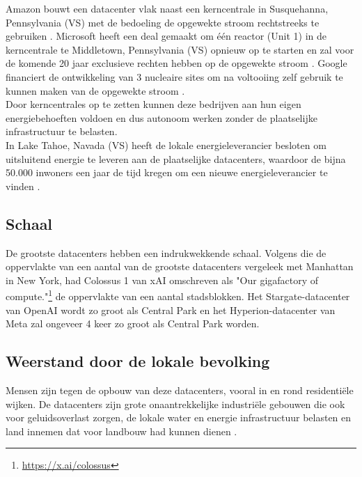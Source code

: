 Amazon bouwt een datacenter vlak naast een kerncentrale in Susquehanna, Pennsylvania (VS) met de bedoeling de opgewekte stroom rechtstreeks te gebruiken \autocite{Moseman2024}. Microsoft heeft een deal gemaakt om één reactor (Unit 1) in de kerncentrale te Middletown, Pennsylvania (VS) opnieuw op te starten en zal voor de komende 20 jaar exclusieve rechten hebben op de opgewekte stroom \autocite{Reuters2024}. Google financiert de ontwikkeling van 3 nucleaire sites om na voltooiing zelf gebruik te kunnen maken van de opgewekte stroom \autocite{Stevens2025}. \\

Door kerncentrales op te zetten kunnen deze bedrijven aan hun eigen energiebehoeften voldoen en dus autonoom werken zonder de plaatselijke infrastructuur te belasten. \\

In Lake Tahoe, Navada (VS) heeft de lokale energieleverancier besloten om uitsluitend energie te leveren aan de plaatselijke datacenters, waardoor de bijna 50.000 inwoners een jaar de tijd kregen om een nieuwe energieleverancier te vinden \autocite{Gioino2026}.\\

\subsection{Schaal}
\label{ssec:schaal}
De grootste datacenters hebben een indrukwekkende schaal. Volgens \textcite{Cottier2025} die de oppervlakte van een aantal van de grootste datacenters vergeleek met Manhattan in New York, had Colossus 1 van xAI omschreven als "Our gigafactory of compute."\footnote{\href{https://x.ai/colossus}{https://x.ai/colossus}} de oppervlakte van een aantal stadsblokken. Het Stargate-datacenter van OpenAI wordt zo groot als Central Park en het Hyperion-datacenter van Meta zal ongeveer 4 keer zo groot als Central Park worden.

\subsection{Weerstand door de lokale bevolking}
Mensen zijn tegen de opbouw van deze datacenters, vooral in en rond residentiële wijken. De datacenters zijn grote onaantrekkelijke industriële gebouwen die ook voor geluidsoverlast zorgen, de lokale water en energie infrastructuur belasten en land innemen dat voor landbouw had kunnen dienen \autocite{Bahar2026}. \\

